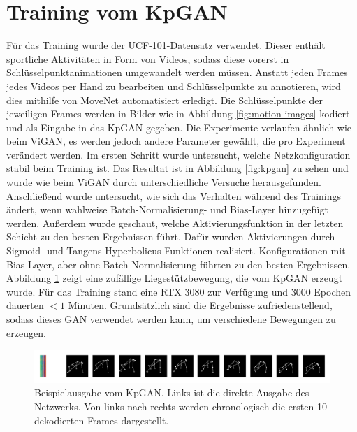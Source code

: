 \section{Training vom KpGAN}
Für das Training wurde der UCF-101-Datensatz \cite{ucf101} verwendet. Dieser
enthält sportliche Aktivitäten in Form von Videos, sodass diese vorerst in
Schlüsselpunktanimationen umgewandelt werden müssen. Anstatt jeden Frames jedes
Videos per Hand zu bearbeiten und Schlüsselpunkte zu annotieren, wird dies
mithilfe von MoveNet \cite{movenet} automatisiert erledigt. Die Schlüsselpunkte
der jeweiligen Frames werden in Bilder wie in Abbildung \ref{fig:motion-images}
kodiert und als Eingabe in das KpGAN gegeben. Die Experimente verlaufen ähnlich
wie beim ViGAN, es werden jedoch andere Parameter gewählt, die pro Experiment
verändert werden. Im ersten Schritt wurde untersucht, welche Netzkonfiguration
stabil beim Training ist. Das Resultat ist in Abbildung \ref{fig:kpgan} zu
sehen und wurde wie beim ViGAN durch unterschiedliche Versuche herausgefunden.
Anschließend wurde untersucht, wie sich das Verhalten während des Trainings
ändert, wenn wahlweise Batch-Normalisierung- und Bias-Layer hinzugefügt werden.
Außerdem wurde geschaut, welche Aktivierungsfunktion in der letzten Schicht zu
den besten Ergebnissen führt. Dafür wurden Aktivierungen durch Sigmoid- und
Tangens-Hyperbolicus-Funktionen realisiert. Konfigurationen mit Bias-Layer, aber
ohne Batch-Normalisierung führten zu den besten Ergebnissen. Abbildung
\ref{fig:kpgan-example} zeigt eine zufällige Liegestützbewegung, die vom KpGAN
erzeugt wurde. Für das Training stand eine RTX 3080 zur Verfügung und 3000
Epochen dauerten $< 1$ Minuten. Grundsätzlich sind die Ergebnisse
zufriedenstellend, sodass dieses GAN verwendet werden kann, um verschiedene
Bewegungen zu erzeugen.

\begin{figure}
    \includegraphics[width=\textwidth]{images/kpgan-example.png}
    \caption{Beispielausgabe vom KpGAN. Links ist die direkte Ausgabe des
    Netzwerks. Von links nach rechts werden chronologisch die ersten 10
    dekodierten Frames dargestellt.}
    \label{fig:kpgan-example}
\end{figure}


